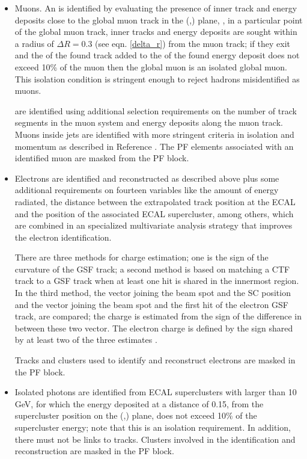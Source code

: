 \begin{itemize}

\item Muons. An  is identified by evaluating the presence of inner track and energy deposits close to the global muon track in the (\etac,\phic) plane, \ie, in a particular point of the global muon track, inner tracks and energy deposits are sought within a radius of $\Delta R=0.3$ (see eqn. \ref{delta_r}) from the muon track; if they exit and the \pt of the found track added to the \Et of the found energy deposit does not exceed 10\% of the muon \pt then the global muon is an isolated global muon. This isolation condition is stringent enough to reject hadrons misidentified as muons.

   are identified using additional selection requirements on the number of track segments in the muon system and energy deposits along the muon track. Muons inside jets are identified with more stringent criteria in isolation and momentum as described in Reference \cite{muon_req}. The PF elements associated with an identified muon are masked from the PF block.  

\item Electrons are identified and reconstructed as described above plus some additional requirements on fourteen variables like the amount of energy radiated, the distance between the extrapolated track position at the ECAL and the position of the associated ECAL supercluster, among others, which are combined in an specialized multivariate analysis strategy that improves the electron identification.

There are three methods for charge estimation; one is the sign of the curvature of the GSF track; a second method is based on matching a CTF track to a GSF track when at least one hit is shared in the innermost region. In the third method, the vector joining the beam spot and the SC position and the vector joining the beam spot and the first hit of the electron GSF track, are compared; the charge is estimated from the sign of the difference in \phic between these two vector. The electron charge is defined by the sign shared by at least two of the three estimates \cite{mva_eid1}.
  
Tracks and clusters used to identify and reconstruct electrons are masked in the PF block.  
  
\item Isolated photons are identified from ECAL superclusters with \Et larger than 10 GeV, for which the energy deposited at a distance of 0.15, from the supercluster position on the (\etac,\phic) plane, does not exceed 10\% of the supercluster energy; note that this is an isolation requirement. In addition, there must not be links to tracks. Clusters involved in the identification and reconstruction are masked in the PF block.


\end{itemize}
